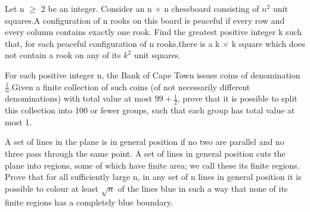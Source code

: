 \item Let n $\geq$ 2 be an integer. Consider an n $\times$ n chessboard consisting of $n^2$ unit squares.A configuration of n rooks on this board is peaceful if every row and every column contains exactly one rook. Find the greatest positive integer k such that, for each peaceful configuration of n rooks,there is a 
k $\times$ k square which does not contain a rook on any of its $k^2$ unit squares.

\item For each positive integer n, the Bank of Cape Town issues coins of denomination $\frac{1}{n}$.Given a finite collection of such coins (of not necessarily different denominations) with total value at most
 $99 +\frac{1}{2}$, prove that it is possible to split this collection into 100 or fewer groups, such that each group has total value at most 1.

\item A set of lines in the plane is in general position if no two are parallel and no three pass through the same point. A set of lines in general position cuts the plane into regions, some of which have finite area; we call these its finite regions. Prove that for all sufficiently large n, in any set of n lines in general position it is possible to colour at least $\sqrt{n}$ of the lines blue in such a way that none of its finite regions has a completely blue boundary.
